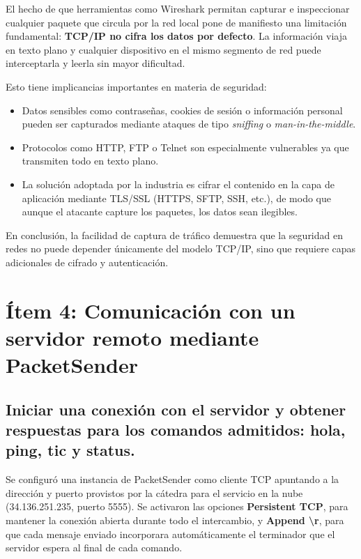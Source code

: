 \documentclass[12pt,a4paper]{article}
\let\oldsection\section
\renewcommand{\section}{\clearpage\oldsection}
\begin{document}
El hecho de que herramientas como Wireshark permitan capturar e inspeccionar cualquier paquete que circula por la red local pone de manifiesto una limitación fundamental: \textbf{TCP/IP no cifra los datos por defecto}. La información viaja en texto plano y cualquier dispositivo en el mismo segmento de red puede interceptarla y leerla sin mayor dificultad.

Esto tiene implicancias importantes en materia de seguridad:

\begin{itemize}
  \item Datos sensibles como contraseñas, cookies de sesión o información personal pueden ser capturados mediante ataques de tipo \textit{sniffing} o \textit{man-in-the-middle}.
  \item Protocolos como HTTP, FTP o Telnet son especialmente vulnerables ya que transmiten todo en texto plano.
  \item La solución adoptada por la industria es cifrar el contenido en la capa de aplicación mediante TLS/SSL (HTTPS, SFTP, SSH, etc.), de modo que aunque el atacante capture los paquetes, los datos sean ilegibles.
\end{itemize}

En conclusión, la facilidad de captura de tráfico demuestra que la seguridad en redes no puede depender únicamente del modelo TCP/IP, sino que requiere capas adicionales de cifrado y autenticación.

\section{Ítem 4: Comunicación con un servidor remoto mediante PacketSender}

\subsection{Iniciar una conexión con el servidor y obtener respuestas para los comandos admitidos: hola, ping, tic y status.}

Se configuró una instancia de PacketSender como cliente TCP apuntando a la dirección y puerto provistos por la cátedra para el servicio en la nube (34.136.251.235, puerto 5555). Se activaron las opciones \textbf{Persistent TCP}, para mantener la conexión abierta durante todo el intercambio, y \textbf{Append \textbackslash r}, para que cada mensaje enviado incorporara automáticamente el terminador que el servidor espera al final de cada comando.
\end{document}
